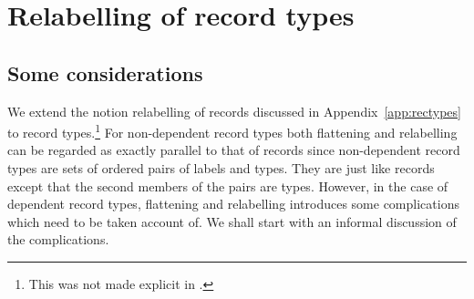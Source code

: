 



\section{Relabelling of record types}
\label{app:relabelling-rectypes}

\subsection{Some considerations}
\label{app:relabelling-rectypes-considerations}

We extend the notion relabelling of records
discussed in Appendix~\ref{app:rectypes} to record types.\footnote{This was
not made explicit in \cite{Cooper2012}.}  For non-dependent record
types both flattening and relabelling can be regarded as exactly parallel to that of
records since non-dependent record types are sets of ordered pairs of
labels and types.  They are just like records except that the second
members of the pairs are types.  However, in the case of dependent
record types, flattening and relabelling introduces some complications
which need to be taken account of.  We shall start with an informal
discussion of the complications.  

